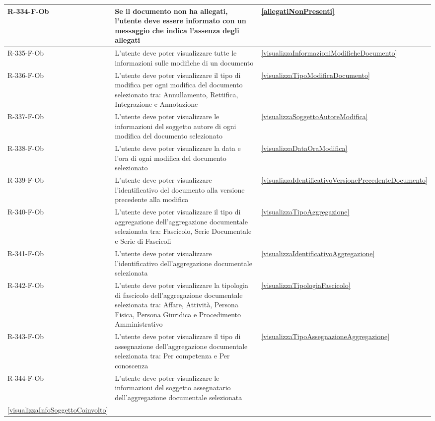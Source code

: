 \begin{longtable}{|p{2.5cm}|p{9.5cm}|p{2.5cm}|}
\hline
R-334-F-Ob & Se il documento non ha allegati, l'utente deve essere informato con un messaggio che indica l'assenza degli allegati & \ref{allegatiNonPresenti} \\
\hline
R-335-F-Ob & L'utente deve poter visualizzare tutte le informazioni sulle modifiche di un documento & \ref{visualizzaInformazioniModificheDocumento} \\
\hline
R-336-F-Ob & L'utente deve poter visualizzare il tipo di modifica per ogni modifica del documento selezionato tra: Annullamento, Rettifica, Integrazione e Annotazione & \ref{visualizzaTipoModificaDocumento} \\
\hline
R-337-F-Ob & L'utente deve poter visualizzare le informazioni del soggetto autore di ogni modifica del documento selezionato & \ref{visualizzaSoggettoAutoreModifica} \\
\hline
R-338-F-Ob & L'utente deve poter visualizzare la data e l'ora di ogni modifica del documento selezionato & \ref{visualizzaDataOraModifica} \\
\hline
R-339-F-Ob & L'utente deve poter visualizzare l'identificativo del documento alla versione precedente alla modifica & \ref{visualizzaIdentificativoVersionePrecedenteDocumento} \\
\hline
R-340-F-Ob & L'utente deve poter visualizzare il tipo di aggregazione dell'aggregazione documentale selezionata tra: Fascicolo, Serie Documentale e Serie di Fascicoli & \ref{visualizzaTipoAggregazione} \\
\hline
R-341-F-Ob & L'utente deve poter visualizzare l'identificativo dell'aggregazione documentale selezionata & \ref{visualizzaIdentificativoAggregazione} \\
\hline
R-342-F-Ob & L'utente deve poter visualizzare la tipologia di fascicolo dell'aggregazione documentale selezionata tra: Affare, Attività, Persona Fisica, Persona Giuridica e Procedimento Amministrativo & \ref{visualizzaTipologiaFascicolo} \\
\hline
R-343-F-Ob & L'utente deve poter visualizzare il tipo di assegnazione dell'aggregazione documentale selezionata tra: Per competenza e Per conoscenza & \ref{visualizzaTipoAssegnazioneAggregazione} \\
\hline
R-344-F-Ob & L'utente deve poter visualizzare le informazioni del soggetto assegnatario dell'aggregazione documentale selezionata &  \begin{tabular}[t]{@{}l} \ref{visualizzaAssegnazioneAggregazione}\\ \ref{visualizzaInfoSoggettoCoinvolto} \end{tabular} \\

\end{longtable}
